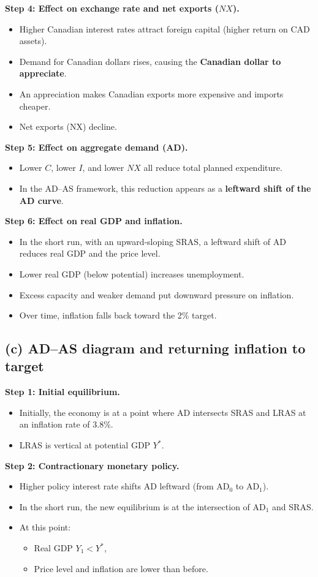\documentclass[12pt]{article}
\begin{document}
\textbf{Step 4: Effect on exchange rate and net exports (\(NX\)).}
\begin{itemize}
    \item Higher Canadian interest rates attract foreign capital (higher return on CAD assets).
    \item Demand for Canadian dollars rises, causing the \textbf{Canadian dollar to appreciate}.
    \item An appreciation makes Canadian exports more expensive and imports cheaper.
    \item Net exports (NX) decline.
\end{itemize}

\textbf{Step 5: Effect on aggregate demand (AD).}
\begin{itemize}
    \item Lower $C$, lower $I$, and lower $NX$ all reduce total planned expenditure.
    \item In the AD--AS framework, this reduction appears as a \textbf{leftward shift of the AD curve}.
\end{itemize}

\textbf{Step 6: Effect on real GDP and inflation.}
\begin{itemize}
    \item In the short run, with an upward-sloping SRAS, a leftward shift of AD reduces real GDP and the price level.
    \item Lower real GDP (below potential) increases unemployment.
    \item Excess capacity and weaker demand put downward pressure on inflation.
    \item Over time, inflation falls back toward the 2\% target.
\end{itemize}

\subsection*{(c) AD--AS diagram and returning inflation to target}

\textbf{Step 1: Initial equilibrium.}
\begin{itemize}
    \item Initially, the economy is at a point where AD intersects SRAS and LRAS at an inflation rate of 3.8\%.
    \item LRAS is vertical at potential GDP $Y^*$.
\end{itemize}

\textbf{Step 2: Contractionary monetary policy.}
\begin{itemize}
    \item Higher policy interest rate shifts AD leftward (from AD\(_0\) to AD\(_1\)).
    \item In the short run, the new equilibrium is at the intersection of AD\(_1\) and SRAS.
    \item At this point:
    \begin{itemize}
        \item Real GDP \(Y_1 < Y^*\),
        \item Price level and inflation are lower than before.
    \end{itemize}
\end{itemize}
\end{document}
